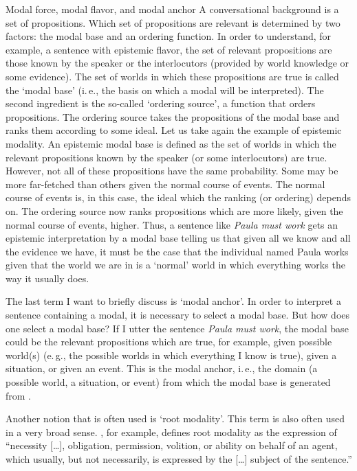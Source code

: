 \begin{digression}{{Modal force, modal flavor, and modal anchor}}{}
A conversational background is a set of propositions. Which set of propositions are relevant is determined by two factors: the modal base and an ordering function. In order to understand, for example, a sentence with epistemic flavor, the set of relevant propositions are those known by the speaker or the interlocutors (provided by world knowledge or some evidence).  The set of worlds in which these propositions are true is called the `modal base' (i.\,e., the basis on which a modal will be interpreted). The second ingredient is the so-called `ordering source', a function that orders propositions. The ordering source takes the propositions of the modal base and ranks them according to some ideal. Let us take again the example of epistemic modality. An epistemic modal base is defined as the set of worlds in which the relevant propositions known by the speaker (or some interlocutors) are true. However, not all of these propositions have the same probability. Some may be more far-fetched than others given the normal course of events. The normal course of events is, in this case, the ideal which the ranking (or ordering) depends on. The ordering source now ranks propositions which are more likely, given the normal course of events, higher. Thus, a sentence like \textit{Paula must work} gets an epistemic interpretation by a modal base telling us that given all we know and all the evidence we have, it must be the case that the individual named Paula works given that the world we are in is a `normal' world in which everything works the way it usually does.

The last term I want to briefly discuss is `modal anchor'. In order to interpret a sentence containing a modal, it is necessary to select a modal base. But how does one select a modal base? If I utter the sentence \textit{Paula must work}, the modal base could be the relevant propositions which are true, for example, given possible world(s) (e.\,g., the possible worlds in which everything I know is true), given a situation, or given an event. This is the modal anchor, i.\,e., the domain (a possible world, a situation, or event) from which the modal base is generated from \citep{mckenzie2018latent}.   
\end{digression}


\noindent Another notion that is often used is `root modality'. This term is also often used in a very broad sense. \citet[44]{platzack1979semantic}, for example, defines root modality as the expression of ``necessity [\dots ], obligation, permission, volition, or ability on behalf of an agent, which usually, but not necessarily, is expressed by the [\dots ] subject of the sentence.''

